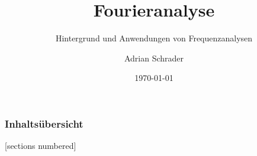 \documentclass[10pt]{beamer}
\title{Fourieranalyse}
\subtitle{Hintergrund und Anwendungen von Frequenzanalysen}
\date{\today}
\author{Adrian Schrader}
\institute{Physik 4h, Herr Kuhn}
\begin{document}
\maketitle

\begin{frame}
  \frametitle{Inhaltsübersicht}
  [sections numbered]
  \tableofcontents
\end{frame}






\begin{frame}[allowframebreaks]

  \nocite{*}
  
  

\end{frame}
\end{document}
